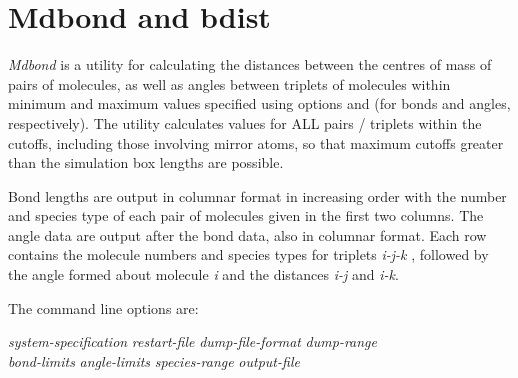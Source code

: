 \documentclass[a4paper,twoside]{report}
\begin{document}
\section{Mdbond and bdist}%

\emph{Mdbond} is a utility for calculating the distances between the centres
of mass of pairs of molecules, as well as angles between triplets of
molecules within minimum and maximum values specified using options
 and  (for bonds and angles, respectively). The
utility calculates values for ALL pairs / triplets within the cutoffs,
including those involving mirror atoms, so that maximum cutoffs
greater than the simulation box lengths are possible.
        
Bond lengths are output in columnar format in increasing order with
the number and species type of each pair of molecules given in the
first two columns. The angle data are output after the bond data, also
in columnar format. Each row contains the molecule numbers and species
types for triplets \emph{i-j-k} , followed by the angle formed about
molecule \emph{i} and the distances \emph{i-j} and \emph{i-k}.

The command line options are:

\begin{center}
\Lit{[-s} \textit{system-specification} \Lit{|}
 \textit{restart-file}\Lit{]}
\Lit{[-d} \textit{dump-file-format}\Lit{]}
\Lit{[-t} \textit{dump-range}\Lit{]} \\
\Lit{[-b} \textit{bond-limits}\Lit{]} 
\Lit{[-a} \textit{angle-limits}\Lit{]} 
\Lit{[-g} \textit{species-range}\Lit{]} 
\Lit{[-c]}
\Lit{[-o} \textit{output-file}\Lit{]}
\end{center}
\end{document}
